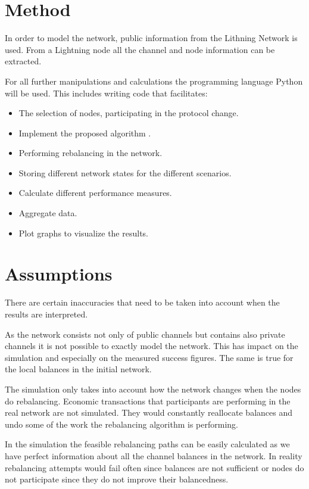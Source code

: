 \documentclass[final]{fhnwreport}       %
\begin{document}
\section{Method}

In order to model the network, public information from the Lithning Network is used. From a Lightning node all the channel and node information can be extracted.

For all further manipulations and calculations the programming language Python will be used. This includes writing code that facilitates: 
\begin{itemize}
  \item The selection of nodes, participating in the protocol change.
  \item Implement the proposed algorithm \cite[p.~3]{pickhardt_imbalance_2019}.
  \item Performing rebalancing in the network.
  \item Storing different network states for the different scenarios.
  \item Calculate different performance measures.
  \item Aggregate data.
  \item Plot graphs to visualize the results.
\end{itemize}

\section{Assumptions}
There are certain inaccuracies that need to be taken into account when the results are interpreted. 

As the network consists not only of public channels but contains also private channels it is not possible to exactly model the network. This has impact on the simulation and especially on the measured success figures. The same is true for the local balances in the initial network. 

The simulation only takes into account how the network changes when the nodes do rebalancing. Economic transactions that participants are performing in the real network are not simulated. They would constantly reallocate balances and undo some of the work the rebalancing algorithm is performing.

In the simulation the feasible rebalancing paths can be easily calculated as we have perfect information about all the channel balances in the network. In reality rebalancing attempts would fail often since balances are not sufficient or nodes do not participate since they do not improve their balancedness.
\end{document}
